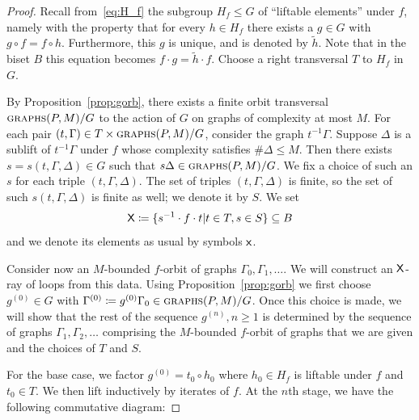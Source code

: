 \documentclass{amsart}
\theoremstyle{definition}
\theoremstyle{remark}
\newcommand{\sfX}{{\sf X}}
\newcommand{\sfx}{{\sf x}}
\newcommand{\graphs}{\text{\sc{graphs}}}
\begin{document}
\begin{proof}
  Recall from~\eqref{eq:H_f} the subgroup $H_f\le G$ of ``liftable elements'' under $f$, namely with the property that for every $h\in H_f$ there exists a $g\in G$ with $g \circ f=f \circ h$. Furthermore, this $g$ is unique, and is denoted by $\widetilde h$. Note that in the biset $B$ this equation becomes $f \cdot g = \widetilde{h} \cdot f$.  Choose a right transversal $T$ to $H_f$ in $G$.
  
By Proposition~\ref{prop:gorb}, there exists a finite orbit transversal $\graphs(P,M)/G$ to the action of $G$ on graphs of complexity at most $M$.  For each pair $(t, \Gamma)\in T \times \graphs(P,M)/G$, consider the graph $t^{-1}\Gamma$.  Suppose $\Delta$ is a sublift of $t^{-1}\Gamma$ under $f$ whose complexity satisfies $\#\Delta \leq M$. Then there exists $s=s(t, \Gamma, \Delta)\in G$ such that $s\Delta\in \graphs(P,M)/G$.  We fix a choice of such an $s$ for each triple $(t, \Gamma, \Delta)$. The set of triples $(t, \Gamma, \Delta)$ is finite, so the set of such $s(t,\Gamma,\Delta)$ is finite as well; we denote it by $S$. We set 
\[ \sfX\coloneqq\{s^{-1}\cdot f \cdot t | t\in T, s\in S\} \subseteq B\]
and we denote its elements as usual by symbols $\sfx$. 
  
 Consider now an $M$-bounded $f$-orbit of graphs $\Gamma_0, \Gamma_1, \ldots$.  We will construct an $\sfX$-ray of loops from this data. Using Proposition~\ref{prop:gorb} we first choose $g^{(0)}\in G$ with $\Gamma^{(0)}\coloneqq g^{(0)}\Gamma_0\in \graphs(P,M)/G$.  Once this choice is made, we will show that the rest of the sequence $g^{(n)}, n \geq 1$ is determined by the sequence of graphs $\Gamma_1, \Gamma_2, \ldots$ comprising the $M$-bounded $f$-orbit of graphs that we are given and the choices of $T$ and $S$.   
  
 For the base case, we factor $g^{(0)}=t_0\circ h_0$ where $h_0\in H_f$ is liftable under $f$ and $t_0\in T$.  We then lift inductively by iterates of $f$. At the $n$th stage, we  have the following commutative diagram:


\end{proof}
\end{document}
